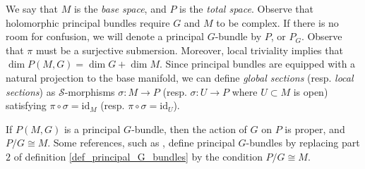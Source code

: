 We say that \(M\) is the \textit{base space}, and \(P\) is the \textit{total space}. Observe that holomorphic principal bundles require \(G\) and \(M\) to be complex. If there is no room for confusion, we will denote a principal \(G\)-bundle by \(P\), or \(P_G\). Observe that \(\pi\) must be a surjective submersion. Moreover, local triviality implies that \(\dim P(M,G)=\dim G + \dim M\). Since principal bundles are equipped with a natural projection to the base manifold, we can define \textit{global sections} (resp. \textit{local sections}) as \(\mathcal{S}\)-morphisms \(\sigma\colon M \to P\) (resp. \(\sigma\colon U \to P\) where \(U \subset M\) is open) satisfying \(\pi\circ \sigma=\mathrm{id}_M\) (resp. \(\pi \circ \sigma=\mathrm{id}_U\)). 

\begin{obs} \label{action_principal_G_bundle}
    If \(P(M,G)\) is a principal \(G\)-bundle, then the action of \(G\) on \(P\) is proper, and \(P/G \cong M\). Some references, such as \parencite{kobayashi_vol1}, define principal \(G\)-bundles by replacing part \(2\) of definition \ref{def_principal_G_bundles} by the condition \(P/G \cong M\). %
\end{obs}

